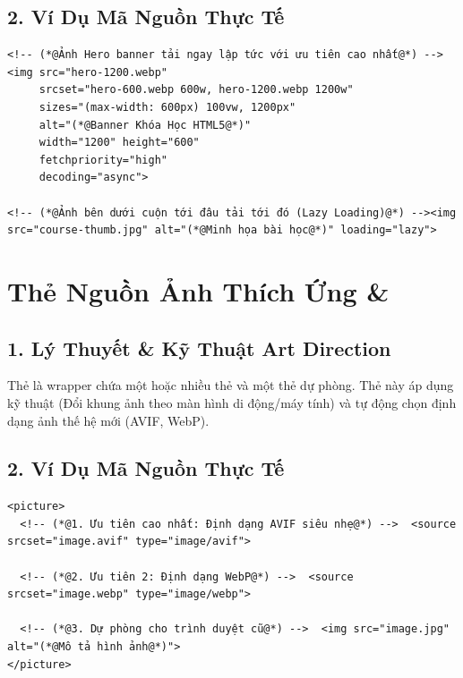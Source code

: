 \subsection{2. Ví Dụ Mã Nguồn Thực Tế}
\begin{lstlisting}[language=HTML5, caption={Ví dụ ảnh chuẩn Responsive kèm Lazy Loading và Fetch Priority}]
<!-- (*@Ảnh Hero banner tải ngay lập tức với ưu tiên cao nhất@*) --><img src="hero-1200.webp"
     srcset="hero-600.webp 600w, hero-1200.webp 1200w"
     sizes="(max-width: 600px) 100vw, 1200px"
     alt="(*@Banner Khóa Học HTML5@*)"
     width="1200" height="600"
     fetchpriority="high"
     decoding="async">

<!-- (*@Ảnh bên dưới cuộn tới đâu tải tới đó (Lazy Loading)@*) --><img src="course-thumb.jpg" alt="(*@Minh họa bài học@*)" loading="lazy">
\end{lstlisting}

\section{Thẻ Nguồn Ảnh Thích Ứng  \& }
\subsection{1. Lý Thuyết \& Kỹ Thuật Art Direction}
Thẻ  là wrapper chứa một hoặc nhiều thẻ  và một thẻ  dự phòng. Thẻ này áp dụng kỹ thuật  (Đổi khung ảnh theo màn hình di động/máy tính) và tự động chọn định dạng ảnh thế hệ mới (AVIF, WebP).

\subsection{2. Ví Dụ Mã Nguồn Thực Tế}
\begin{lstlisting}[language=HTML5, caption={Ví dụ đổi định dạng ảnh AVIF/WebP với thẻ picture}]
<picture>
  <!-- (*@1. Ưu tiên cao nhất: Định dạng AVIF siêu nhẹ@*) -->  <source srcset="image.avif" type="image/avif">
  
  <!-- (*@2. Ưu tiên 2: Định dạng WebP@*) -->  <source srcset="image.webp" type="image/webp">
  
  <!-- (*@3. Dự phòng cho trình duyệt cũ@*) -->  <img src="image.jpg" alt="(*@Mô tả hình ảnh@*)">
</picture>
\end{lstlisting}

